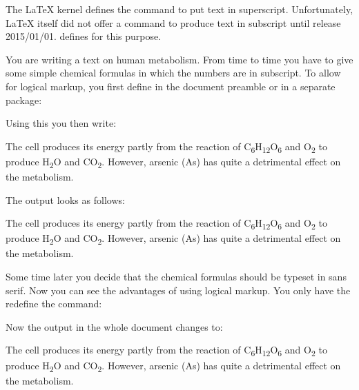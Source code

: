 %
  \begin{Declaration}
  \end{Declaration}
  The \LaTeX{} kernel defines the command
   to put text in
  superscript. Unfortunately,
  \LaTeX{} itself did not offer a command to
  produce text in subscript until
  release 2015/01/01. \KOMAScript{} defines  for this
  purpose. %
  \ifthiscommonfirst
    \begin{Example}
      You are writing a text on human metabolism. From time to time you
      have to give some simple chemical formulas in which the numbers are
      in subscript. To allow for logical markup, you first define in the
      document preamble or in a separate package:
\begin{lstcode}
  \newcommand*{\molec}[2]{#1\textsubscript{#2}}
\end{lstcode}
      \newcommand*{\molec}[2]{#1\textsubscript{#2}}
      Using this you then write:
\begin{lstcode}
  The cell produces its energy partly from the reaction of \molec C6\molec
  H{12}\molec O6 and \molec O2 to produce \molec H2\Molec O{} and
  \molec C{}\molec O2.  However, arsenic (\molec{As}{}) has quite a
  detrimental effect on the metabolism.
\end{lstcode}
      The output looks as follows:
      \begin{ShowOutput}
        The cell produces its energy partly from the reaction of \molec C6\molec
        H{12}\molec O6 and \molec O2 to produce \molec H2\molec O{} and
        \molec C{}\molec O2.  However, arsenic (\molec{As}{}) has quite a
        detrimental effect on the metabolism.
      \end{ShowOutput}

      Some time later you decide that the chemical formulas should be
      typeset in sans serif. Now you can see the advantages of using
      logical markup. You only have the redefine the 
      command:
\begin{lstcode}
  \newcommand*{\molec}[2]{\textsf{#1\textsubscript{#2}}}
\end{lstcode}
      \renewcommand*{\molec}[2]{\textsf{#1\textsubscript{#2}}}
      Now the output in the whole document changes to:
      \begin{ShowOutput}
        The cell produces its energy partly from the reaction of \molec
        C6\molec H{12}\molec O6 and \molec O2 to produce \molec H2\molec
        O{} and \molec C{}\molec O2.  However, arsenic (\molec{As}{}) has
        quite a detrimental effect on the metabolism.
      \end{ShowOutput}
    \end{Example}
